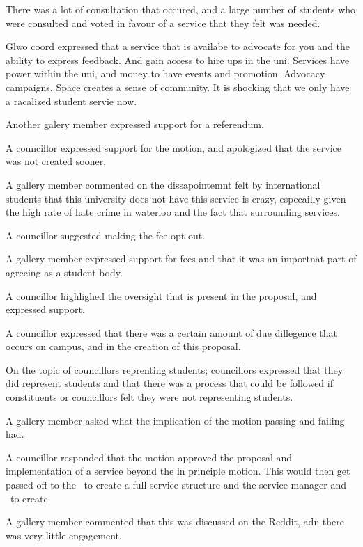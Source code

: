 \begin{motion}
    There was a lot of consultation that occured, and a large number of students
    who were consulted and voted in favour of a service that they felt was 
    needed.

    Glwo coord expressed that a service that is availabe to advocate for you and
    the ability to express feedback. And gain access to hire ups in the uni.
    Services have power within the uni, and money to have events and promotion.
    Advocacy campaigns. Space creates a sense of community. It is shocking that
    we only have a racalized student servie now.

    Another galery member expressed support for a referendum.

    A councillor expressed support for the motion, and apologized that the
    service was not created sooner. 

    A gallery member commented on the dissapointemnt felt by international 
    students that this university does not have this service is crazy,
    especailly given the high rate of hate crime in waterloo and the fact that
    surrounding services.

    A councillor suggested making the fee opt-out. 

    A gallery member expressed support for fees and that it was an importnat
    part of agreeing as a student body.

    A councillor highlighed the oversight that is present in the proposal, 
    and expressed support.

    A councillor expressed that there was a certain amount of due dillegence 
    that occurs on campus, and in the creation of this proposal. 

    On the topic of councillors reprenting students; councillors expressed that
    they did represent students and that there was a process that could be
    followed if constituents or councillors felt they were not representing
    students.

    A gallery member asked what the implication of the motion passing
    and failing had.

    A councillor responded that the motion approved the proposal and
    implementation of a service beyond the in principle motion. This would then
    get passed off to the \vpi\ to create a full service structure and the
    service manager and \clac\ to create.

    A gallery member commented that this was discussed on the Reddit, adn there
    was very little engagement.


\end{motion}
